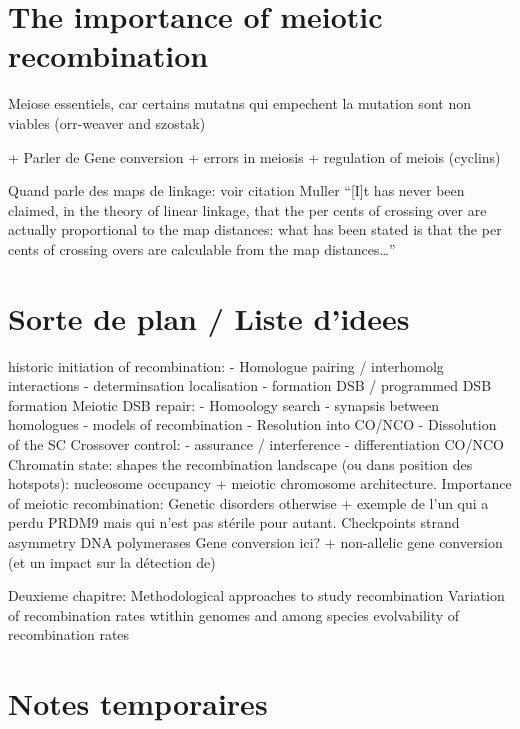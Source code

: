 \section{The importance of meiotic recombination}

Meiose essentiels, car certains mutatns qui empechent la mutation sont non viables (orr-weaver and szostak)

+ Parler de Gene conversion
+ errors in meiosis
+ regulation of meiois (cyclins)



Quand parle des maps de linkage: voir citation Muller %
“[I]t has never been claimed, in the theory of linear linkage, that the per cents of crossing over are actually proportional to the map distances: what has been stated is that the per cents of crossing overs are calculable from the map distances…”





\section*{Sorte de plan / Liste d'idees}
historic
initiation of recombination: 
- Homologue pairing / interhomolg interactions
- determinsation localisation
- formation DSB / programmed DSB formation
Meiotic DSB repair:
- Homoology search
- synapsis between homologues
- models of recombination
- Resolution into CO/NCO
- Dissolution of the SC
Crossover control: 
- assurance / interference
- differentiation CO/NCO
Chromatin state: shapes the recombination landscape (ou dans position des hotspots): nucleosome occupancy + meiotic chromosome architecture. 
Importance of meiotic recombination: Genetic disorders otherwise + exemple de l'un qui a perdu PRDM9 mais qui n'est pas stérile pour autant. 
Checkpoints
strand asymmetry
DNA polymerases
Gene conversion ici? + non-allelic gene conversion (et un impact sur la détection de)



Deuxieme chapitre:
Methodological approaches to study recombination
Variation of recombination rates wtithin genomes and among species
evolvability of recombination rates



\section*{Notes temporaires}

